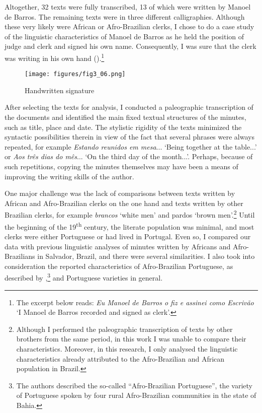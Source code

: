 \documentclass[output=paper,colorlinks,citecolor=brown]{langscibook}
\begin{document}
Altogether, 32 texts were fully transcribed, 13 of which were written by Manoel de Barros. The remaining texts were in three different calligraphies. Although these very likely were African or Afro-Brazilian clerks, I chose to do a case study of the linguistic characteristics of Manoel de Barros as he held the position of judge and clerk and signed his own name. Consequently, I was sure that the clerk was writing in his own hand ().\footnote{The excerpt below reads: \emph{Eu Manoel de Barros o fiz e assinei como Escrivão} ‘I Manoel de Barros recorded and signed as clerk’.}

\begin{figure}[!ht]
    \centering
    \texttt{[image: figures/fig3\_06.png]}
    \caption{Handwritten signature}
    \label{fig:fig3_06}
\end{figure}

After selecting the texts for analysis, I conducted a paleographic transcription of the documents and identified the main fixed textual structures of the minutes, such as title, place and date. The stylistic rigidity of the texts minimized the syntactic possibilities therein in view of the fact that several phrases were always repeated, for example \emph{Estando reunidos em mesa}... ‘Being together at the table...’ or \emph{Aos três dias do mês}... ‘On the third day of the month...’. Perhaps, because of such repetitions, copying the minutes themselves may have been a means of improving the writing skills of the author.

One major challenge was the lack of comparisons between texts written by African and Afro-Brazilian clerks on the one hand and texts written by other Brazilian clerks, for example \emph{brancos} ‘white men’ and pardos ‘brown men’.\footnote{Although I performed the paleographic transcription of texts by other brothers from the same period, in this work I was unable to compare their characteristics. Moreover, in this research, I only analysed the linguistic characteristics already attributed to the Afro-Brazilian and African population in Brazil.}  Until the beginning of the 19\textsuperscript{th} century, the literate population was minimal, and most clerks were either Portuguese or had lived in Portugal. Even so, I compared our data with previous linguistic analyses of minutes written by Africans and Afro-Brazilians in Salvador, Brazil, and there were several similarities. I also took into consideration the reported characteristics of Afro-Brazilian Portuguese, as described by \citet{Lucchesi_Baxter_Ribeiro_2009},\footnote{The authors described the so-called “Afro-Brazilian Portuguese”, the variety of Portuguese spoken by four rural Afro-Brazilian communities in the state of Bahia.} and Portuguese varieties in general.
\end{document}
